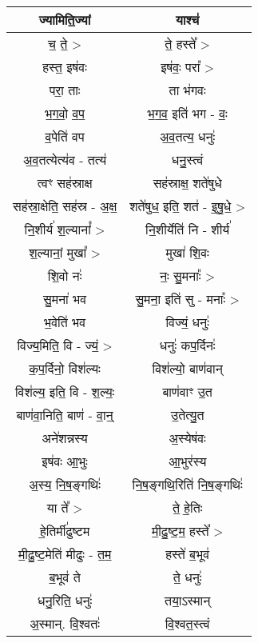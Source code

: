 {\begin{longtable}{|c|c|}
\hline
ज्यामिति॒ज्यां               & याश्च॑\\
\hline
च॒ ते॒ >                    & ते॒ हस्ते᳚ >\\
\hline
हस्त॒ इष॑वः                 & इष॑वः॒ परा᳚ >\\
\hline
परा॒ ताः                  & ता भ॑गवः\\
\hline
भ॒ग॒वो॒ व॒प॒                  & भ॒ग॒व॒ इति॑ भग - वः॒\\
\hline
व॒पेति॑ वप                  & अ॒व॒तत्य॒ धनुः॑\\
\hline
अ॒व॒तत्येत्य॑व - तत्य॑           & धनु॒स्त्वं\\
\hline
त्वꣳ सह॑स्राक्ष              & सह॑स्राक्ष॒ शते॑षुधे\\
\hline
सह॑स्रा॒क्षेति॒ सह॑स्र - अ॒क्ष॒     & शते॑षुध॒ इति॒ शत॑ - इ॒षु॒धे॒ >\\
\hline
नि॒शीर्य॑ श॒ल्यानां᳚ >          & नि॒शीर्येति॑ नि - शीर्य॑\\
\hline
श॒ल्यानां॒ मुखा᳚ >             & मुखा॑ शि॒वः\\
\hline
शि॒वो नः॑                  & नः॒ सु॒मनाः᳚ >\\
\hline
सु॒मना॑ भव                  & सु॒मना॒ इति॑ सु - मनाः᳚ >\\
\hline
भ॒वेति॑ भव                  & विज्यं॒ धनुः॑\\
\hline
विज्य॒मिति॒ वि - ज्यं॒ >       & धनुः॑ कप॒र्दिनः॑\\
\hline
क॒प॒र्दिनो॒ विश॑ल्यः           & विश॑ल्यो॒ बाण॑वान्\\
\hline
विश॑ल्य॒ इति॒ वि - श॒ल्यः॒      & बाण॑वाꣳ उ॒त\\
\hline
बाण॑वा॒निति॒ बाण॑ - वा॒न्॒      & उ॒तेत्यु॒त\\
\hline
अने॑शन्नस्य                  & अ॒स्येष॑वः\\
\hline
इष॑वः आ॒भुः                 & आ॒भुर॑स्य\\
\hline
अ॒स्य॒ नि॒ष॒ङ्गथिः॑             & नि॒ष॒ङ्गथि॒रिति॑ नि॒ष॒ङ्गथिः॑\\
\hline
या ते᳚ >                   & ते॒ हे॒तिः\\
\hline
हे॒तिर्मी॑ढुष्टम               & मी॒ढु॒ष्ट॒म॒ हस्ते᳚ >\\
\hline
मी॒ढु॒ष्ट॒मेति॑ मीढुः - त॒म॒       & हस्ते॑ ब॒भूव॑\\
\hline
ब॒भूव॑ ते                    & ते॒ धनुः॑\\
\hline
धनु॒रिति॒ धनुः॑               & तया॒ऽस्मान्\\
\hline
अ॒स्मान्. वि॒श्वतः॑            & वि॒श्वत॒स्त्वं\\

\end{longtable}}
